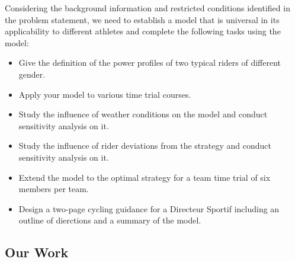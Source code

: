 \documentclass{mcmthesis}
\begin{document}
Considering the background information and restricted conditions identified in the problem statement, we need to establish a model that is universal in its applicability to different athletes and complete the following tasks using the model: 
\begin{itemize}
	\item Give the definition of the power profiles of two typical riders of different gender.
	\item Apply your model to various time trial courses.
	\item Study the influence of weather conditions on the model and conduct sensitivity analysis on it.
	\item Study the influence of rider deviations from the strategy and conduct sensitivity analysis on it.
	\item Extend the model to the optimal strategy for a team time trial of six members per team.
	\item Design a two-page cycling guidance for a Directeur Sportif including an outline of dierctions and a summary of the model.
\end{itemize}







\subsection{Our Work}
\end{document}
